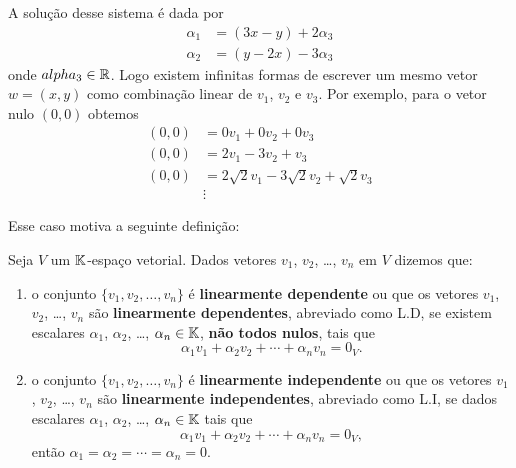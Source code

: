 A solução desse sistema é dada por
\begin{align*}
	\alpha_1 &= (3x - y) + 2\alpha_3\\
	\alpha_2 &= (y - 2x) - 3\alpha_3
\end{align*}
onde $alpha_3 \in \mathbb{R}$. Logo existem infinitas formas de escrever um mesmo vetor $w = (x, y)$ como
combinação linear de $v_1$, $v_2$ e $v_3$. Por exemplo, para o vetor nulo $(0, 0)$ obtemos
\begin{align*}
	(0, 0) &= 0v_1 + 0v_2 + 0v_3\\
	(0, 0) &= 2v_1 - 3v_2 + v_3\\
	(0, 0) &= 2\sqrt{2}v_1 - 3\sqrt{2}v_2 + \sqrt{2}v_3\\
				 &\vdots
\end{align*}

Esse caso motiva a seguinte definição:
\begin{definicao}
  Seja $V$ um $\mathbb{K}$-espaço vetorial. Dados vetores $v_1$, $v_2$, \dots, $v_n$ em $V$ dizemos que:
  \begin{enumerate}[label={\roman*})]
    \item o conjunto $\{v_1, v_2, \dots, v_n\}$ é \textbf{linearmente dependente} ou que os vetores $v_1$, $v_2$, \dots, $v_n$ 
    	são \textbf{linearmente dependentes}, abreviado como L.D, se existem escalares
      $\alpha_1$, $\alpha_2$, \dots, $\alpha_n \in \mathbb{K}$, \textbf{não todos nulos}, tais que
      \[
        \alpha_1v_1 + \alpha_2v_2 + \cdots + \alpha_nv_n = 0_V.
      \]

    \item o conjunto $\{v_1, v_2, \dots, v_n\}$ é \textbf{linearmente independente} ou que os vetores $v_1$, $v_2$, \dots, $v_n$ 
    	são \textbf{linearmente independentes}, abreviado como L.I, se dados escalares
      $\alpha_1$, $\alpha_2$, \dots, $\alpha_n \in \mathbb{K}$  tais que
      \[
        \alpha_1v_1 + \alpha_2v_2 + \cdots + \alpha_nv_n = 0_V,
      \]
      então $\alpha_1 = \alpha_2 = \cdots = \alpha_n = 0$.
  \end{enumerate}
\end{definicao}

